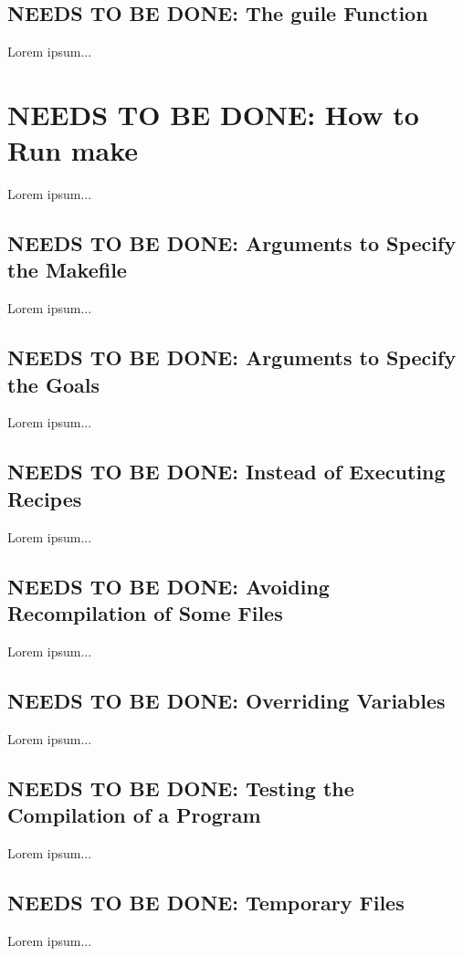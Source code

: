 \documentclass{charun}
\begin{document}
\begin{multicols*}{2}
\color{gray}
\subsection{NEEDS TO BE DONE: The guile Function}
Lorem ipsum...
\color{black}


\color{gray}
\section{NEEDS TO BE DONE: How to Run make}
Lorem ipsum...
\color{black}


\color{gray}
\subsection{NEEDS TO BE DONE: Arguments to Specify the Makefile}
Lorem ipsum...
\color{black}

\color{gray}
\subsection{NEEDS TO BE DONE: Arguments to Specify the Goals}
Lorem ipsum...
\color{black}

\color{gray}
\subsection{NEEDS TO BE DONE: Instead of Executing Recipes}
Lorem ipsum...
\color{black}

\color{gray}
\subsection{NEEDS TO BE DONE: Avoiding Recompilation of Some Files}
Lorem ipsum...
\color{black}

\color{gray}
\subsection{NEEDS TO BE DONE: Overriding Variables}
Lorem ipsum...
\color{black}

\color{gray}
\subsection{NEEDS TO BE DONE: Testing the Compilation of a Program}
Lorem ipsum...
\color{black}

\color{gray}
\subsection{NEEDS TO BE DONE: Temporary Files}
Lorem ipsum...
\color{black}


\end{multicols*}
\end{document}
